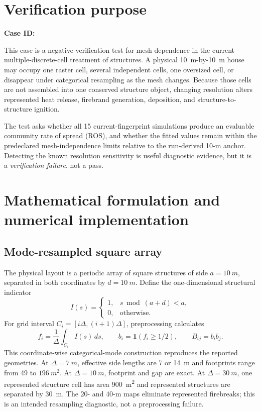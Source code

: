 \section{Verification purpose}

\textbf{Case ID:} \CaseID

This case is a negative verification test for mesh dependence in the current
multiple-discrete-cell treatment of structures. A physical
\SI{10}{m}-by-\SI{10}{m} house may occupy one raster cell, several independent
cells, one oversized cell, or disappear under categorical resampling as the
mesh changes. Because those cells are not assembled into one conserved
structure object, changing resolution alters represented heat release,
firebrand generation, deposition, and structure-to-structure ignition.

The test asks whether all 15 current-fingerprint simulations produce an
evaluable community rate of spread (ROS), and whether the fitted values remain
within the predeclared mesh-independence limits relative to the run-derived
10-m anchor. Detecting the known resolution sensitivity is useful diagnostic
evidence, but it is a \emph{verification failure}, not a pass.

\section{Mathematical formulation and numerical implementation}

\subsection{Mode-resampled square array}

The physical layout is a periodic array of square structures of side
\(a=\SI{10}{m}\), separated in both coordinates by
\(d=\SI{10}{m}\). Define the one-dimensional structural indicator
\[
 I(s)=\begin{cases}1,&s\bmod(a+d)<a,\\0,&\text{otherwise.}\end{cases}
\]
For grid interval \(C_i=[i\Delta,(i+1)\Delta]\), preprocessing calculates
\[
 f_i=\frac{1}{\Delta}\int_{C_i}I(s)\,ds,
 \qquad b_i=\mathbf{1}(f_i\ge 1/2),
 \qquad B_{ij}=b_i b_j .
\]
This coordinate-wise categorical-mode construction reproduces the reported
geometries. At \(\Delta=\SI{7}{m}\), effective side lengths are 7 or
\SI{14}{m} and footprints range from 49 to \(\SI{196}{m^2}\). At
\(\Delta=\SI{10}{m}\), footprint and gap are exact. At
\(\Delta=\SI{30}{m}\), one represented structure cell has area
\SI{900}{m^2} and represented structures are separated by \SI{30}{m}.
The 20- and 40-m maps eliminate represented firebreaks; this is an intended
resampling diagnostic, not a preprocessing failure.

